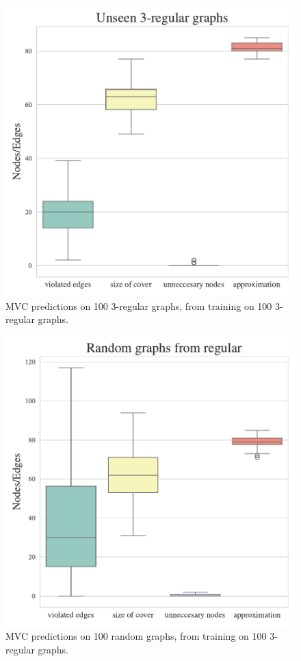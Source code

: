\begin{figure}[h]
    \centering
    \includegraphics[width=\linewidth]{Project2TSP/_src/figures/mvc_regular_to_regular.pdf}
    \caption{MVC predictions on 100 $3$-regular graphs, from training on 100 $3$-regular graphs.}
    \label{fig:mvc_regular_to_regular}
\end{figure}

\begin{figure}[h]
    \centering
    \includegraphics[width=\linewidth]{Project2TSP/_src/figures/mvc_regular_to_random.pdf}
    \caption{MVC predictions on 100 random graphs, from training on 100 $3$-regular graphs.}
    \label{fig:mvc_regular_to_random}
\end{figure}


